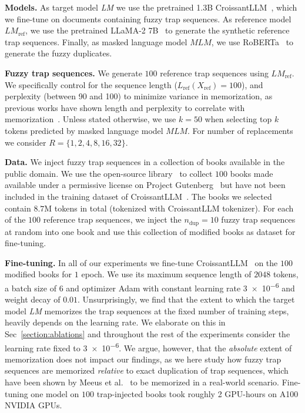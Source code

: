 \textbf{Models.} As target model \textit{LM} we use the pretrained 1.3B CroissantLLM~\cite{faysse2024croissantllm}, which we fine-tune on documents containing fuzzy trap sequences. As reference model $\textit{LM}_{\text{ref}}$, we use the pretrained LLaMA-2 7B~\cite{touvron2023llama2} to generate the synthetic reference trap sequences. Finally, as masked language model $\textit{MLM}$, we use RoBERTa~\cite{liu2019roberta} to generate the fuzzy duplicates.

\textbf{Fuzzy trap sequences.} We generate $100$ reference trap sequences using $\textit{LM}_{\text{ref}}$. We specifically control for the sequence length ($L_{\text{ref}}(X_{\text{ref}}) = 100$), and perplexity (between 90 and 100) to minimize variance in memorization, as previous works have shown length and perplexity to correlate with memorization~\cite{meeus2024copyright, carlini2022quantifying}. Unless stated otherwise, we use $k=50$ when selecting top $k$ tokens predicted by masked language model $\textit{MLM}$. For number of replacements we consider $R=\{1, 2, 4, 8, 16, 32\}$.

\textbf{Data.} We inject fuzzy trap sequences in a collection of books available in the public domain. We use the open-source library~\cite{kpullygutenberg} to collect $100$ books made available under a permissive license on Project Gutenberg~\cite{projectgutenberg} but have not been included in the training dataset of CroissantLLM~\cite{faysse2024croissantllm}. The books we selected contain $8.7$M tokens in total (tokenized with CroissantLLM tokenizer). For each of the $100$ reference trap sequences, we inject the $n_{\text{dup}}=10$ fuzzy trap sequences at random into one book and use this collection of modified books as dataset for fine-tuning. 

\textbf{Fine-tuning.} In all of our experiments we fine-tune CroissantLLM~\cite{faysse2024croissantllm} on the $100$ modified books for $1$ epoch. We use its maximum sequence length of $2048$ tokens, a batch size of $6$ and optimizer Adam with constant learning rate \num{3e-6} and weight decay of $0.01$. Unsurprisingly, we find that the extent to which the target model \textit{LM} memorizes the trap sequences at the fixed number of training steps, heavily depends on the learning rate. We elaborate on this in Sec~\ref{section:ablations} and throughout the rest of the experiments consider the learning rate fixed to \num{3e-6}. We argue, however, that the \emph{absolute} extent of memorization does not impact our findings, as we here study how fuzzy trap sequences are memorized \emph{relative} to exact duplication of trap sequences, which have been shown by Meeus et al.~\cite{meeus2024copyright} to be memorized in a real-world scenario. Fine-tuning one model on $100$ trap-injected books took roughly 2 GPU-hours on A100 NVIDIA GPUs.

